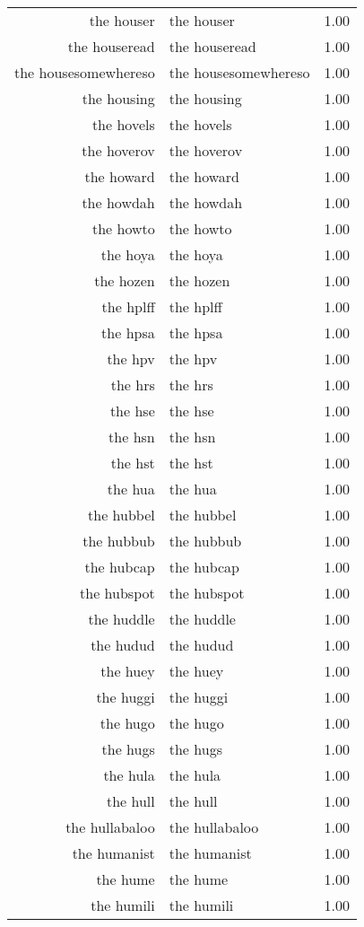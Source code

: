 \begin{table}[ht]
\begin{tabular}{rlr}
  the houser & the houser & 1.00 \\ 
  the houseread & the houseread & 1.00 \\ 
  the housesomewhereso & the housesomewhereso & 1.00 \\ 
  the housing & the housing & 1.00 \\ 
  the hovels & the hovels & 1.00 \\ 
  the hoverov & the hoverov & 1.00 \\ 
  the howard & the howard & 1.00 \\ 
  the howdah & the howdah & 1.00 \\ 
  the howto & the howto & 1.00 \\ 
  the hoya & the hoya & 1.00 \\ 
  the hozen & the hozen & 1.00 \\ 
  the hplff & the hplff & 1.00 \\ 
  the hpsa & the hpsa & 1.00 \\ 
  the hpv & the hpv & 1.00 \\ 
  the hrs & the hrs & 1.00 \\ 
  the hse & the hse & 1.00 \\ 
  the hsn & the hsn & 1.00 \\ 
  the hst & the hst & 1.00 \\ 
  the hua & the hua & 1.00 \\ 
  the hubbel & the hubbel & 1.00 \\ 
  the hubbub & the hubbub & 1.00 \\ 
  the hubcap & the hubcap & 1.00 \\ 
  the hubspot & the hubspot & 1.00 \\ 
  the huddle & the huddle & 1.00 \\ 
  the hudud & the hudud & 1.00 \\ 
  the huey & the huey & 1.00 \\ 
  the huggi & the huggi & 1.00 \\ 
  the hugo & the hugo & 1.00 \\ 
  the hugs & the hugs & 1.00 \\ 
  the hula & the hula & 1.00 \\ 
  the hull & the hull & 1.00 \\ 
  the hullabaloo & the hullabaloo & 1.00 \\ 
  the humanist & the humanist & 1.00 \\ 
  the hume & the hume & 1.00 \\ 
  the humili & the humili & 1.00 \\ 

\end{tabular}
\end{table}
